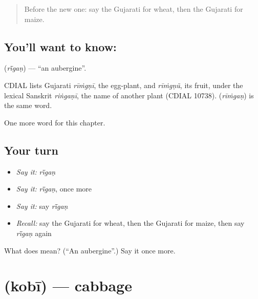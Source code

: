 \label{lesson:GU-C114-rigan}



\begin{quote}
Before the new one: say the Gujarati for wheat, then the Gujarati for maize.
\end{quote}

\subsection*{You'll want to know: }
\textbf{} (\emph{rī̃gaṇ}) — \textquotedblleft{}an aubergine\textquotedblright{}.

\begin{cousinweb}
CDIAL lists Gujarati \emph{rīṁgṇī}, the egg-plant, and \emph{rīṁgṇũ}, its fruit, under the lexical Sanskrit \emph{riṅgaṇī}, the name of another plant (CDIAL 10738). \textbf{} (\emph{rīṁgaṇ}) is the same word.
\end{cousinweb}

\begin{grammarlens}[title={What you've built}]
One more word for this chapter.
\end{grammarlens}

\subsection*{Your turn}
\begin{itemize}
\raggedright
  \item \emph{Say it:} \emph{rī̃gaṇ}
  \item \emph{Say it:} \emph{rī̃gaṇ}, once more
  \item \emph{Say it:} say \emph{rī̃gaṇ}
  \item \emph{Recall:} say the Gujarati for wheat, then the Gujarati for maize, then say \emph{rī̃gaṇ} again
\end{itemize}

\begin{tcolorbox}[breakable,colback=teal!4,colframe=teal!35!black,title={Before you move on}]
What does  mean? (\textquotedblleft{}An aubergine\textquotedblright{}.) Say it once more.
\end{tcolorbox}
\section[\texorpdfstring{\gu{કોબી} (kobī)}{કોબી (kobī)}]{ (kobī) — cabbage}

\label{lesson:GU-C114-kobi}



